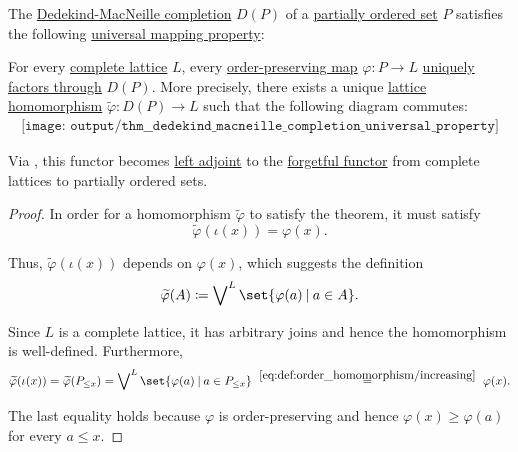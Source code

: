 \begin{theorem}\label{thm:dedekind_macneille_completion_universal_property}
  The \hyperref[def:dedekind_macnielle_completion]{Dedekind-MacNeille completion} \( D(P) \) of a \hyperref[def:partially_ordered_set]{partially ordered set} \( P \) satisfies the following \hyperref[rem:universal_mapping_property]{universal mapping property}:
  \begin{displayquote}
    For every \hyperref[def:semilattice/lattice]{complete lattice} \( L \), every \hyperref[def:order_homomorphism/increasing]{order-preserving map} \( \varphi: P \to L \) \hyperref[def:factors_through]{uniquely factors through} \( D(P) \). More precisely, there exists a unique \hyperref[def:semilattice/homomorphism]{lattice homomorphism} \( \widetilde{\varphi}: D(P) \to L \) such that the following diagram commutes:
    \begin{equation}\label{eq:thm:dedekind_macneille_completion_universal_property/diagram}
      \begin{aligned}
        \texttt{[image: output/thm\_\_dedekind\_macneille\_completion\_universal\_property]}
      \end{aligned}
    \end{equation}
  \end{displayquote}

  Via , this functor becomes \hyperref[def:category_adjunction]{left adjoint} to the \hyperref[def:concrete_category]{forgetful functor} from complete lattices to partially ordered sets.
\end{theorem}
\begin{proof}
  In order for a homomorphism \( \widetilde{\varphi} \) to satisfy the theorem, it must satisfy
  \begin{equation*}
    \widetilde{\varphi}(\iota(x)) = \varphi(x).
  \end{equation*}

  Thus, \( \widetilde{\varphi}(\iota(x)) \) depends on \( \varphi(x) \), which suggests the definition
  \begin{equation*}
    \widetilde{\varphi}(A) \coloneqq \bigvee\nolimits^L \set{ \varphi(a) \given a \in A }.
  \end{equation*}

  Since \( L \) is a complete lattice, it has arbitrary joins and hence the homomorphism is well-defined. Furthermore,
  \begin{equation*}
    \widetilde{\varphi}(\iota(x))
    =
    \widetilde{\varphi}(P_{\leq x})
    =
    \bigvee\nolimits^L \set{ \varphi(a) \given a \in P_{\leq x} }
    \reloset {\eqref{eq:def:order_homomorphism/increasing}} =
    \varphi(x).
  \end{equation*}

  The last equality holds because \( \varphi \) is order-preserving and hence \( \varphi(x) \geq \varphi(a) \) for every \( a \leq x \).
\end{proof}

